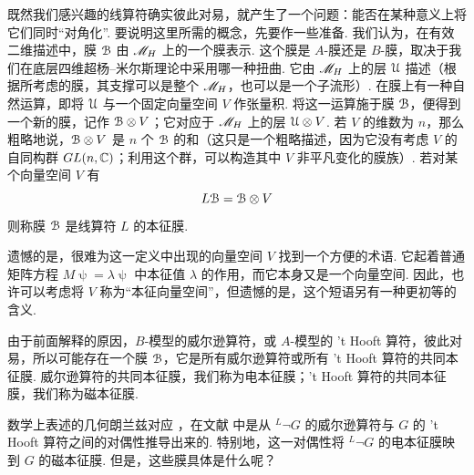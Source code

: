 既然我们感兴趣的线算符确实彼此对易，就产生了一个问题：能否在某种意义上将它们同时“对角化”. 要说明这里所需的概念，先要作一些准备.
我们认为，在有效二维描述中，膜 ${\mathcal B}$ 由 ${{\mathscr{M}}_H}$ 上的一个膜表示. 这个膜是 $A$-膜还是 $B$-膜，取决于我们在底层四维超杨--米尔斯理论中采用哪一种扭曲. 它由 ${{\mathscr{M}}_H}$ 上的层 ${\mathcal U}$ 描述（根据所考虑的膜，其支撑可以是整个 ${{\mathscr{M}}_H}$，也可以是一个子流形）. 在膜上有一种自然运算，即将 ${\mathcal U}$ 与一个固定向量空间 $V$ 作张量积. 将这一运算施于膜 ${\mathcal B}$，便得到一个新的膜，记作 ${\mathcal B}\otimes V$；它对应于 ${{\mathscr{M}}_H}$ 上的层 ${\mathcal U}\otimes V$. 若 $V$ 的维数为 $n$，那么粗略地说，${\mathcal B}\otimes V$ 是 $n$ 个 ${\mathcal B}$ 的和（这只是一个粗略描述，因为它没有考虑 $V$ 的自同构群 $GL(n,{\mathbb C})$；利用这个群，可以构造其中 $V$ 非平凡变化的膜族）.
若对某个向量空间 $V$ 有
\begin{equation}\label{zollo}L{\mathcal B}={\mathcal B}\otimes V \end{equation}
则称膜 ${\mathcal B}$ 是线算符 $L$ 的本征膜.

遗憾的是，很难为这一定义中出现的向量空间 $V$ 找到一个方便的术语. 它起着普通矩阵方程 $M\uppsi=\lambda \uppsi$ 中本征值 $\lambda$ 的作用，而它本身又是一个向量空间. 因此，也许可以考虑将 $V$ 称为“本征向量空间”，但遗憾的是，这个短语另有一种更初等的含义.

由于前面解释的原因，$B$-模型的威尔逊算符，或 $A$-模型的 't Hooft 算符，彼此对易，所以可能存在一个膜 ${\mathcal B}$，它是所有威尔逊算符或所有 't Hooft 算符的共同本征膜. 威尔逊算符的共同本征膜，我们称为电本征膜；'t Hooft 算符的共同本征膜，我们称为磁本征膜.

数学上表述的几何朗兰兹对应 \cite{BD}，在文献 \cite{KW} 中是从 $^L\neg G$ 的威尔逊算符与 $G$ 的 't Hooft 算符之间的对偶性推导出来的. 特别地，这一对偶性将 $^L\neg G$ 的电本征膜映到 $G$ 的磁本征膜. 但是，这些膜具体是什么呢？

